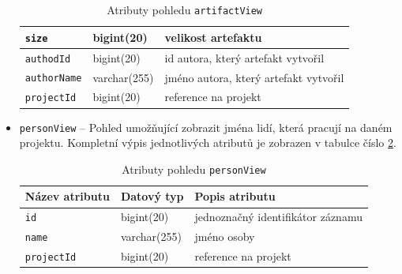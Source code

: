 \documentclass[czech,DP]{thesiskiv}
\begin{document}
\begin{itemize}
\begin{table}[]
\begin{tabular}{|l|l|l|}
        \texttt{size}           & bigint(20)          & velikost artefaktu                          \\ \hline
        \texttt{authodId}       & bigint(20)          & id autora, který artefakt vytvořil          \\ \hline
        \texttt{authorName}     & varchar(255)        & jméno autora, který artefakt vytvořil       \\ \hline
        \texttt{projectId}      & bigint(20)          & reference na projekt                        \\ \hline
        \end{tabular}
        \caption{\label{tab:artifactview}Atributy pohledu \texttt{artifactView}}
    \end{table}

    \item \texttt{personView} -- Pohled umožňující zobrazit jména lidí, která pracují na daném projektu. Kompletní výpis jednotlivých atributů je zobrazen v tabulce číslo \ref{tab:personview}.
    \begin{table}[]
        \begin{tabular}{|l|l|l|}
        \hline
        \textbf{Název atributu} & \textbf{Datový typ} & \textbf{Popis atributu}           \\ \hline \hline
        \texttt{id}             & bigint(20)          & jednoznačný identifikátor záznamu \\ \hline
        \texttt{name}           & varchar(255)        & jméno osoby                       \\ \hline
        \texttt{projectId}      & bigint(20)          & reference na projekt              \\ \hline
        \end{tabular}
        \caption{\label{tab:personview}Atributy pohledu \texttt{personView}}
    \end{table}


\end{itemize}
\end{document}
